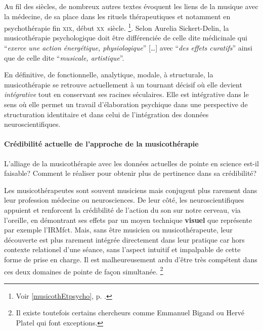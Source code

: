  



 Au fil des siècles, de nombreux autres 
textes évoquent les liens de la musique avec la médecine, de sa place dans les 
rituels thérapeutiques et notamment en psychothérapie fin \textsc{xix}\ieme, 
début \textsc{xx}\ieme\ siècle. \footnote{Voir \ref{musicothEtpsycho},
  p. \pageref{musicothEtpsycho}.}.
Selon Aurelia Sickert-Delin, la musicothérapie 
psychologique doit être différenciée de celle dite médicinale qui 
\enquote{\emph{exerce une action 
énergétique, physiologique}} [\dots] avec \enquote{\emph{des effets curatifs}}  
ainsi que de celle dite \enquote{\emph{musicale, artistique}}. 

 En définitive, de fonctionnelle, analytique, mo\-da\-le,  à 
struc\-tu\-rale, la musicothérapie se retrouve actuellement 
 à un tournant décisif où elle devient 
 \emph{intégrative} tout en conservant ses racines séculaires. Elle est 
intégrative dans le sens où elle permet un travail d'élaboration psychique dans une perspective de structuration identitaire \autocite[ch. III, p. 53, 
105]{vrait_musicotherapie_2018} et dans celui de l'intégration des données 
neuroscientifiques.
 


 
\paragraph{Crédibilité actuelle de l'approche de la musicothérapie }


L'alliage de la musicothérapie avec les données actuelles de pointe en
science est-il faisable? Comment le réaliser pour obtenir plus de pertinence
dans sa crédibilité?

 
Les musicothérapeutes sont souvent musiciens mais conjugent plus
rarement dans leur profession
médecine ou neurosciences. De leur côté, les neuroscientifiques appuient
et renforcent la crédibilité de l'action du son sur notre cerveau, via
l'oreille, en démontrant ses effets par un moyen technique
\textbf{visuel} que représente par exemple l'IRMfct. Mais, sans être musicien ou
musicothérapeute, leur découverte est plus rarement intégrée
directement dans leur pratique car hors contexte relationel d'une
séance, sans l'aspect intuitif et impalpable de cette forme de prise
en charge.
Il est malheureusement ardu d'être très compétent dans ces deux domaines
de pointe de façon simultanée.   \footnote  {Il existe toutefois certains chercheurs
comme Emmanuel Bigand ou Hervé Platel qui font exceptions.}

